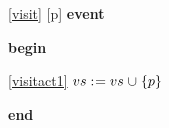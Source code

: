 \noindent \ref{visit} [p] \textbf{event}
\begin{block}
  \item   \textbf{begin}
  \begin{block}
  \item[ \eqref{visitact1} ]{$vs \mathrel{:\mkern1mu=} vs \mathbin{\mkern1mu\cup\mkern1mu} \{ p \} $} %
  \end{block}
  \item   \textbf{end} \\
\end{block}
